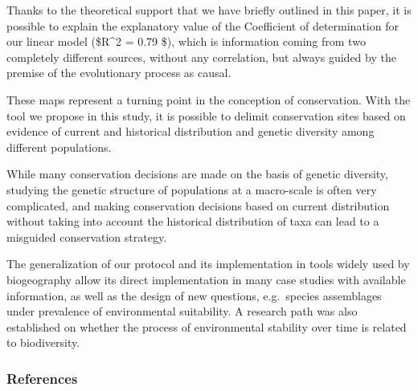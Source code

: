 \documentclass[
]{article}
\begin{document}
Thanks to the theoretical support that we have briefly outlined in this
paper, it is possible to explain the explanatory value of the
Coefficient of determination for our linear model (\$R\^{}2 = 0.79 \$),
which is information coming from two completely different sources,
without any correlation, but always guided by the premise of the
evolutionary process as causal.

These maps represent a turning point in the conception of conservation.
With the tool we propose in this study, it is possible to delimit
conservation sites based on evidence of current and historical
distribution and genetic diversity among different populations.

While many conservation decisions are made on the basis of genetic
diversity, studying the genetic structure of populations at a
macro-scale is often very complicated, and making conservation decisions
based on current distribution without taking into account the historical
distribution of taxa can lead to a misguided conservation strategy.

The generalization of our protocol and its implementation in tools
widely used by biogeography allow its direct implementation in many case
studies with available information, as well as the design of new
questions, e.g.~species assemblages under prevalence of environmental
suitability. A research path was also established on whether the process
of environmental stability over time is related to biodiversity.

\hypertarget{references}{%
\subsubsection*{References}\label{references}}
\end{document}
